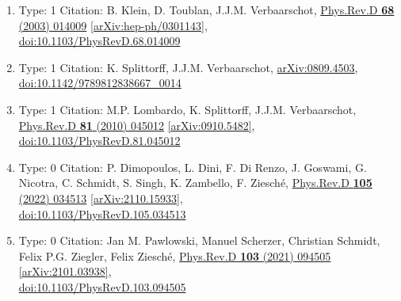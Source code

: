 \documentclass[a4paper,10pt]{article}
\begin{document}
\begin{enumerate}
\begin{enumerate}
  \item Type: 1 Citation: B. Klein, D. Toublan, J.J.M. Verbaarschot, \href{https://www.doi.org/10.1103/PhysRevD.68.014009}{Phys.Rev.D {\bf 68} (2003) 014009}  \href{https://arxiv.org/abs/hep-ph/0301143}{[arXiv:hep-ph/0301143]},\\\href{https://www.doi.org/10.1103/PhysRevD.68.014009}{doi:10.1103/PhysRevD.68.014009}
  \item Type: 1 Citation: K. Splittorff, J.J.M. Verbaarschot, \href{https://arxiv.org/abs/0809.4503}{arXiv:0809.4503},\\\href{https://www.doi.org/10.1142/9789812838667_0014}{doi:10.1142/9789812838667\_0014}
  \item Type: 1 Citation: M.P. Lombardo, K. Splittorff, J.J.M. Verbaarschot, \href{https://www.doi.org/10.1103/PhysRevD.81.045012}{Phys.Rev.D {\bf 81} (2010) 045012}  \href{https://arxiv.org/abs/0910.5482}{[arXiv:0910.5482]},\\\href{https://www.doi.org/10.1103/PhysRevD.81.045012}{doi:10.1103/PhysRevD.81.045012}
  \item Type: 0 Citation: P. Dimopoulos, L. Dini, F. Di Renzo, J. Goswami, G. Nicotra, C. Schmidt, S. Singh, K. Zambello, F. Ziesché, \href{https://www.doi.org/10.1103/PhysRevD.105.034513}{Phys.Rev.D {\bf 105} (2022) 034513}  \href{https://arxiv.org/abs/2110.15933}{[arXiv:2110.15933]},\\\href{https://www.doi.org/10.1103/PhysRevD.105.034513}{doi:10.1103/PhysRevD.105.034513}
  \item Type: 0 Citation: Jan M. Pawlowski, Manuel Scherzer, Christian Schmidt, Felix P.G. Ziegler, Felix Ziesché, \href{https://www.doi.org/10.1103/PhysRevD.103.094505}{Phys.Rev.D {\bf 103} (2021) 094505}  \href{https://arxiv.org/abs/2101.03938}{[arXiv:2101.03938]},\\\href{https://www.doi.org/10.1103/PhysRevD.103.094505}{doi:10.1103/PhysRevD.103.094505}

\end{enumerate}
\end{enumerate}
\end{document}
